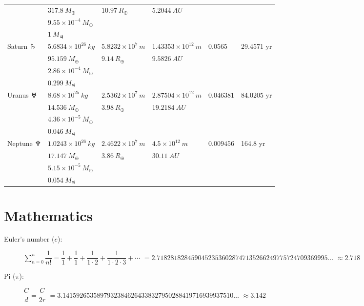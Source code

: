 \documentclass[]{report}
\begin{document}
\begin{tabular}{ |l|l|l|l|l|l| }
					& $317.8\ M_\oplus $				& $10.97\ R_\oplus$			& $5.2044\ AU$					&						&			\\
               		& $9.55 \times 10^{-4}\ M_{\odot}$ 	&							&								&						&			\\
                	& $1\ M_{\jupiter}$				 	&							&								&						&			\\
\hline
Saturn $\saturn$	& $5.6834 \times 10^{26}\ kg$		& $5.8232 \times 10^7\ m$	& $1.43353 \times 10^{12}\ m$	& $0.0565$				& 29.4571 yr\\
					& $95.159\ M_\oplus $				& $9.14\ R_\oplus$			& $9.5826\ AU$					&						&			\\
                	& $2.86 \times 10^{-4}\ M_{\odot}$	&							&								&						&			\\
                    & $0.299\ M_{\jupiter}$				 &							&								&						&			\\
\hline
Uranus $\uranus$	& $8.68 \times 10^{25}\ kg$			& $2.5362 \times 10^7\ m$	& $2.87504 \times 10^{12}\ m$	& $0.046381$			& 84.0205 yr\\
					& $14.536\ M_\oplus $				& $3.98\ R_\oplus$			& $19.2184\ AU$					&						&			\\
                	& $4.36 \times 10^{-5}\ M_{\odot}$ 	&							&								&						&			\\
                    & $0.046\ M_{\jupiter}$				 &							&								&						&			\\
\hline
Neptune	$\neptune$ 	& $1.0243 \times 10^{26}\ kg$		& $2.4622 \times 10^7\ m$	& $4.5 \times 10^{12}\ m$		& $0.009456$			& 164.8 yr\\
					& $17.147\ M_\oplus $				& $3.86\ R_\oplus$			& $30.11\ AU$					&						&			\\
               		& $5.15 \times 10^{-5}\ M_{\odot}$ 	&							&								&						&			\\
                    & $0.054\ M_{\jupiter}$				&							&								&						&			\\
\hline
\end{tabular}


\section{Mathematics}
\begin{description}

\item[Euler's number ($e$):] $\sum\limits_{n=0}^n \dfrac{1}{n!} = \dfrac{1}{1} + \dfrac{1}{1} + \dfrac{1}{1\cdot 2} + \dfrac{1}{1\cdot 2\cdot 3} + \cdots$
\subitem $= 2.71828182845904523536028747135266249775724709369995 \ldots$
\subitem $\approx 2.718$                

\item[Pi ($\pi$):] $\dfrac{C}{d} = \dfrac{C}{2r}$
\subitem $= 3.14159265358979323846264338327950288419716939937510 \ldots$
\subitem $\approx 3.142$
\end{description}
\end{document}
